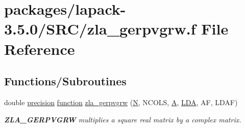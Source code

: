 \hypertarget{zla__gerpvgrw_8f}{}\section{packages/lapack-\/3.5.0/\+S\+R\+C/zla\+\_\+gerpvgrw.f File Reference}
\label{zla__gerpvgrw_8f}
\subsection*{Functions/\+Subroutines}
\begin{DoxyCompactItemize}
\item 
double \hyperlink{numinquire_8h_a2c8e616467665d0b2814d4c1589ba74e}{precision} \hyperlink{afunc_8m_a7b5e596df91eadea6c537c0825e894a7}{function} \hyperlink{group__complex16GEcomputational_gaeb351cf702ddfd6e6a58f2063cea469e}{zla\+\_\+gerpvgrw} (\hyperlink{polmisc_8c_a0240ac851181b84ac374872dc5434ee4}{N}, N\+C\+O\+L\+S, \hyperlink{classA}{A}, \hyperlink{example__user_8c_ae946da542ce0db94dced19b2ecefd1aa}{L\+D\+A}, A\+F, L\+D\+A\+F)
\begin{DoxyCompactList}\small\item\em {\bfseries Z\+L\+A\+\_\+\+G\+E\+R\+P\+V\+G\+R\+W} multiplies a square real matrix by a complex matrix. \end{DoxyCompactList}\end{DoxyCompactItemize}
